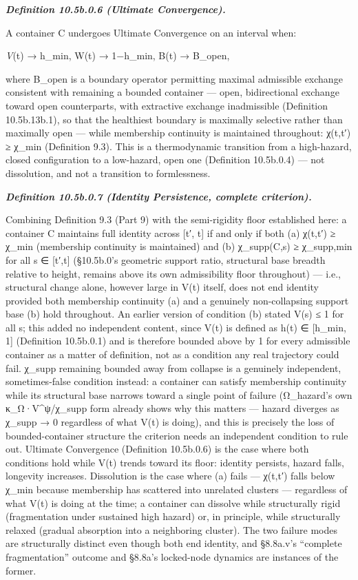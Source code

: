 \documentclass[
]{article}
\begin{document}
\emph{\textbf{Definition 10.5b.0.6 (Ultimate Convergence).}}

A container C undergoes Ultimate Convergence on an interval when:

\emph{V}(t) → h\_min, W(t) → 1−h\_min, B(t) → B\_open,

where B\_open is a boundary operator permitting maximal admissible
exchange consistent with remaining a bounded container --- open,
bidirectional exchange toward open counterparts, with extractive exchange
inadmissible (Definition 10.5b.13b.1), so that the healthiest boundary is
maximally selective rather than maximally open --- while membership
continuity is maintained throughout: χ(t,t′) ≥ χ\_min (Definition 9.3).
This is a thermodynamic transition from a high-hazard, closed
configuration to a low-hazard, open one (Definition 10.5b.0.4) --- not
dissolution, and not a transition to formlessness.

\emph{\textbf{Definition 10.5b.0.7 (Identity Persistence, complete
criterion).}}

Combining Definition 9.3 (Part 9) with the semi-rigidity floor
established here: a container C maintains full identity across {[}t′,
t{]} if and only if both (a) χ(t,t′) ≥ χ\_min (membership continuity is
maintained) and (b) χ\_supp(C,s) ≥ χ\_supp,min for all s ∈ {[}t′,t{]}
(§10.5b.0's geometric support ratio, structural base breadth relative to
height, remains above its own admissibility floor throughout) --- i.e.,
structural change alone, however large in V(t) itself, does not end
identity provided both membership continuity (a) and a genuinely
non-collapsing support base (b) hold throughout. An earlier version of
condition (b) stated V(s) ≤ 1 for all s; this added no independent
content, since V(t) is defined as h(t) ∈ {[}h\_min, 1{]} (Definition
10.5b.0.1) and is therefore bounded above by 1 for every admissible
container as a matter of definition, not as a condition any real
trajectory could fail. χ\_supp remaining bounded away from collapse is a
genuinely independent, sometimes-false condition instead: a container
can satisfy membership continuity while its structural base narrows
toward a single point of failure (Ω\_hazard's own κ\_Ω·V\^{}ψ/χ\_supp
form already shows why this matters --- hazard diverges as χ\_supp → 0
regardless of what V(t) is doing), and this is precisely the loss of
bounded-container structure the criterion needs an independent condition
to rule out. Ultimate Convergence (Definition 10.5b.0.6) is the case
where both conditions hold while V(t) trends toward its floor: identity
persists, hazard falls, longevity increases. Dissolution is the case
where (a) fails --- χ(t,t′) falls below χ\_min because membership has
scattered into unrelated clusters --- regardless of what V(t) is doing
at the time; a container can dissolve while structurally rigid
(fragmentation under sustained high hazard) or, in principle, while
structurally relaxed (gradual absorption into a neighboring cluster).
The two failure modes are structurally distinct even though both end
identity, and §8.8a.v's ``complete fragmentation'' outcome and §8.8a's
locked-node dynamics are instances of the former.
\end{document}
